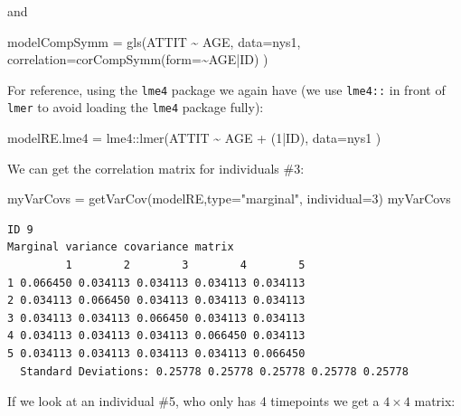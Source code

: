 \documentclass[
  letterpaper,
  DIV=11,
  numbers=noendperiod]{scrreprt}
\newenvironment{Shaded}{\begin{snugshade}}{\end{snugshade}}
\newcommand{\AttributeTok}[1]{\textcolor[rgb]{0.49,0.56,0.16}{#1}}
\newcommand{\DecValTok}[1]{\textcolor[rgb]{0.25,0.63,0.44}{#1}}
\newcommand{\FunctionTok}[1]{\textcolor[rgb]{0.02,0.16,0.49}{#1}}
\newcommand{\NormalTok}[1]{\textcolor[rgb]{0.00,0.44,0.13}{#1}}
\newcommand{\OtherTok}[1]{\textcolor[rgb]{0.00,0.44,0.13}{#1}}
\newcommand{\SpecialCharTok}[1]{\textcolor[rgb]{0.25,0.44,0.63}{#1}}
\newcommand{\StringTok}[1]{\textcolor[rgb]{0.25,0.44,0.63}{#1}}
\begin{document}
and

\begin{Shaded}
\begin{Highlighting}[]
\NormalTok{modelCompSymm }\OtherTok{=} \FunctionTok{gls}\NormalTok{(ATTIT }\SpecialCharTok{\textasciitilde{}}\NormalTok{ AGE,}
                    \AttributeTok{data=}\NormalTok{nys1,}
                    \AttributeTok{correlation=}\FunctionTok{corCompSymm}\NormalTok{(}\AttributeTok{form=}\SpecialCharTok{\textasciitilde{}}\NormalTok{AGE}\SpecialCharTok{|}\NormalTok{ID) )}
\end{Highlighting}
\end{Shaded}

For reference, using the \texttt{lme4} package we again have (we use
\texttt{lme4::} in front of \texttt{lmer} to avoid loading the
\texttt{lme4} package fully):

\begin{Shaded}
\begin{Highlighting}[]
\NormalTok{modelRE.lme4 }\OtherTok{=}\NormalTok{ lme4}\SpecialCharTok{::}\FunctionTok{lmer}\NormalTok{(ATTIT }\SpecialCharTok{\textasciitilde{}}\NormalTok{ AGE }\SpecialCharTok{+}\NormalTok{ (}\DecValTok{1}\SpecialCharTok{|}\NormalTok{ID), }\AttributeTok{data=}\NormalTok{nys1 )}
\end{Highlighting}
\end{Shaded}

We can get the correlation matrix for individuals \#3:

\begin{Shaded}
\begin{Highlighting}[]
\NormalTok{myVarCovs }\OtherTok{=} \FunctionTok{getVarCov}\NormalTok{(modelRE,}\AttributeTok{type=}\StringTok{"marginal"}\NormalTok{, }\AttributeTok{individual=}\DecValTok{3}\NormalTok{)}
\NormalTok{myVarCovs}
\end{Highlighting}
\end{Shaded}

\begin{verbatim}
ID 9 
Marginal variance covariance matrix
         1        2        3        4        5
1 0.066450 0.034113 0.034113 0.034113 0.034113
2 0.034113 0.066450 0.034113 0.034113 0.034113
3 0.034113 0.034113 0.066450 0.034113 0.034113
4 0.034113 0.034113 0.034113 0.066450 0.034113
5 0.034113 0.034113 0.034113 0.034113 0.066450
  Standard Deviations: 0.25778 0.25778 0.25778 0.25778 0.25778 
\end{verbatim}

If we look at an individual \#5, who only has 4 timepoints we get a
\(4 \times 4\) matrix:
\end{document}
